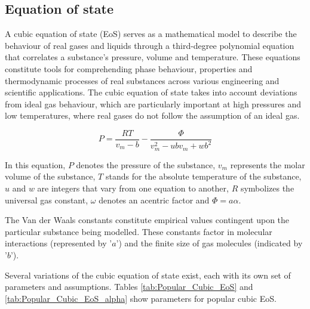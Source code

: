 \documentclass[../Article_Model_Parameters.tex]{subfiles}
\begin{document}
	
	\label{CH: Thermodynamic_details}
	
	\subsection{Equation of state} \label{subsubsec: Equation of state}
	
	A cubic equation of state (EoS) serves as a mathematical model to describe the behaviour of real gases and liquids through a third-degree polynomial equation that correlates a substance's pressure, volume and temperature. These equations constitute tools for comprehending phase behaviour, properties and thermodynamic processes of real substances across various engineering and scientific applications. The cubic equation of state takes into account deviations from ideal gas behaviour, which are particularly important at high pressures and low temperatures, where real gases do not follow the assumption of an ideal gas.
	
	{\footnotesize
		\begin{equation}
			P = \frac{RT}{v_m-b} - \frac{\Phi}{v_m^2 - ubv_m + wb^2}
		\end{equation}
	}
	
	In this equation, $P$ denotes the pressure of the substance, $v_m$ represents the molar volume of the substance, $T$ stands for the absolute temperature of the substance, $u$ and $w$ are integers that vary from one equation to another, $R$ symbolizes the universal gas constant, $\omega$ denotes an acentric factor and $\Phi=a\alpha$.
	
	The Van der Waals constants constitute empirical values contingent upon the particular substance being modelled. These constants factor in molecular interactions (represented by '$a$') and the finite size of gas molecules (indicated by '$b$'). 
	
	Several variations of the cubic equation of state exist, each with its own set of parameters and assumptions. Tables \ref{tab:Popular_Cubic_EoS} and \ref{tab:Popular_Cubic_EoS_alpha} show parameters for popular cubic EoS.
	
	\begin{table}[h!]
		\centering
		\caption{Parameters for Popular Cubic EoS.}
		\label{tab:Popular_Cubic_EoS}
	\end{table}
	
\end{document}
